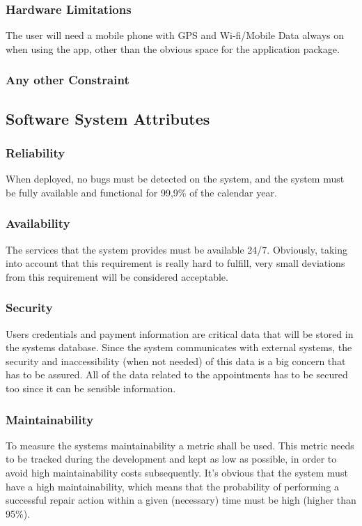 \documentclass[12pt]{article}
\begin{document}
\subsubsection{Hardware Limitations}
The user will need a mobile phone with GPS and Wi-fi/Mobile Data always on when using the app, other than the obvious space for the application package.

\subsubsection{Any other Constraint}

\subsection{Software System Attributes}

\subsubsection{Reliability}
When deployed, no bugs must be detected on the system, and the system must be fully available and functional for 99,9\% of the calendar year. 

\subsubsection{Availability}
The services that the system provides must be available 24/7. Obviously, taking into account that this requirement is really hard to fulfill, very small deviations from this requirement will be considered acceptable.

\subsubsection{Security}
Users credentials and payment information are critical data that will be stored in the systems database. Since the system communicates with external systems, the security and inaccessibility (when not needed) of this data is a big concern that has to be assured. All of the data related to the appointments has to be secured too since it can be sensible information. 

\subsubsection{Maintainability}
To measure the systems maintainability a metric shall be used. This metric needs to be tracked during the development and kept as low as possible, in order to avoid high maintainability costs subsequently. It's obvious that the system must have a high maintainability, which means that the probability of performing a successful repair action within a given (necessary) time must be high (higher than 95\%).
\end{document}
